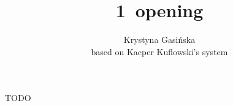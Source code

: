 \documentclass[12pt, a4paper]{article}
\title{1\ntx\ opening}
\author{Krystyna Gasińska\\based on Kacper Kuflowski's system}
\begin{document}
\maketitle


TODO

\end{document}

